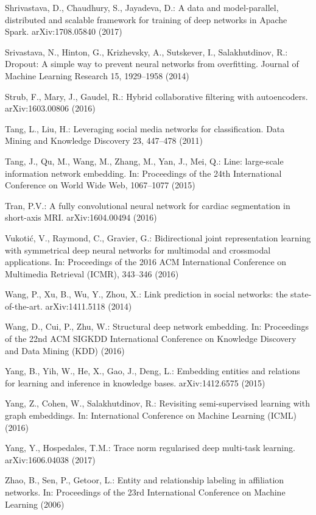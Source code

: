 \documentclass[letterpaper, conference]{IEEEtran}
\begin{document}
\begin{thebibliography}{99}
Shrivastava, D., Chaudhury, S., Jayadeva, D.:
A data and model-parallel, distributed and scalable framework for training of deep networks in Apache Spark.
arXiv:1708.05840 (2017)

Srivastava, N., Hinton, G., Krizhevsky, A., Sutskever, I., Salakhutdinov, R.:
Dropout: A simple way to prevent neural networks from overfitting.
Journal of Machine Learning Research 15, 1929--1958 (2014)

Strub, F., Mary, J., Gaudel, R.:
Hybrid collaborative filtering with autoencoders.
arXiv:1603.00806 (2016)

Tang, L., Liu, H.:
Leveraging social media networks for classification.
Data Mining and Knowledge Discovery 23, 447--478 (2011)

Tang, J., Qu, M., Wang, M., Zhang, M., Yan, J., Mei, Q.:
Line: large-scale information network embedding.
In: Proceedings of the 24th International Conference on World Wide Web, 1067--1077 (2015)

Tran, P.V.:
A fully convolutional neural network for cardiac segmentation in short-axis MRI.
arXiv:1604.00494 (2016)

Vukoti{\'c}, V., Raymond, C., Gravier, G.:
Bidirectional joint representation learning with symmetrical deep neural networks for multimodal and crossmodal applications.
In: Proceedings of the 2016 ACM International Conference on Multimedia Retrieval (ICMR), 343--346 (2016)

Wang, P., Xu, B., Wu, Y., Zhou, X.:
Link prediction in social networks: the state-of-the-art.
arXiv:1411.5118 (2014)

Wang, D., Cui, P., Zhu, W.:
Structural deep network embedding.
In: Proceedings of the 22nd ACM SIGKDD International Conference on Knowledge Discovery and Data Mining (KDD) (2016)

Yang, B., Yih, W., He, X., Gao, J., Deng, L.:
Embedding entities and relations for learning and inference in knowledge bases.
arXiv:1412.6575 (2015)

Yang, Z., Cohen, W., Salakhutdinov, R.:
Revisiting semi-supervised learning with graph embeddings.
In: International Conference on Machine Learning (ICML) (2016)

Yang, Y., Hospedales, T.M.:
Trace norm regularised deep multi-task learning.
arXiv:1606.04038 (2017)

Zhao, B., Sen, P., Getoor, L.:
Entity and relationship labeling in affiliation networks.
In: Proceedings of the 23rd International Conference on Machine Learning (2006)

\end{thebibliography}
\end{document}
